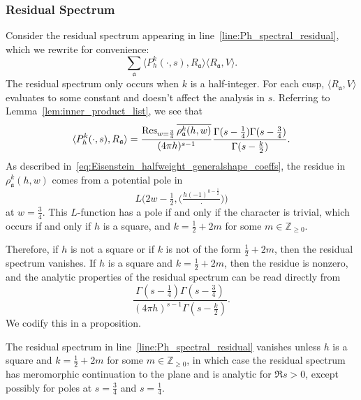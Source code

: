 \subsubsection*{Residual Spectrum}



Consider the residual spectrum appearing in line~\eqref{line:Ph_spectral_residual}, which
we rewrite for convenience:
\begin{equation}
  \sum_{\mathfrak{a}} \langle P_h^k(\cdot, s), R_{\mathfrak{a}} \rangle \langle
  R_{\mathfrak{a}}, V \rangle.
\end{equation}
The residual spectrum only occurs when $k$ is a half-integer.
For each cusp, $\langle R_{\mathfrak{a}}, V \rangle$ evaluates to some constant and
doesn't affect the analysis in $s$.
Referring to Lemma~\ref{lem:inner_product_list}, we see that
\begin{equation}
  \langle P_h^k(\cdot, s), R_{\mathfrak{a}} \rangle = \frac{\operatorname*{Res}_{w = \frac{3}{4}}
  \overline{\rho_\mathfrak{a}^k(h,w)}}{(4\pi h)^{s-1}} \frac{\Gamma(s - \frac{1}{4})
  \Gamma(s - \frac{3}{4})}{\Gamma(s - \frac{k}{2})}.
\end{equation}
As described in~\eqref{eq:Eisenstein_halfweight_generalshape_coeffs}, the residue in
$\rho_\mathfrak{a}^k(h,w)$ comes from a potential pole in
\begin{equation}
  L\Big(2w - \tfrac{1}{2}, \big( \tfrac{h (-1)^{k - \frac{1}{2}}}{\cdot}\big) \Big)
\end{equation}
at $w = \frac{3}{4}$.
This $L$-function has a pole if and only if the character is trivial, which occurs if and
only if $h$ is a square, and $k = \frac{1}{2} + 2m$ for some $m \in \mathbb{Z}_{\geq 0}$.


Therefore, if $h$ is not a square or if $k$ is not of the form $\frac{1}{2} + 2m$, then
the residual spectrum vanishes.
If $h$ is a square and $k = \frac{1}{2} + 2m$, then the residue is nonzero, and the
analytic properties of the residual spectrum can be read directly from
\begin{equation}\label{eq:hyperboloid:residual_analytic_descriptor}
  \frac{\Gamma(s - \frac{1}{4}) \Gamma(s - \frac{3}{4})}{(4\pi h)^{s-1} \Gamma(s -
  \frac{k}{2})}.
\end{equation}
We codify this in a proposition.


\begin{proposition}\label{prop:hyperboloid_residual_props}
  The residual spectrum in line~\eqref{line:Ph_spectral_residual} vanishes unless $h$ is a
  square and $k = \frac{1}{2} + 2m$ for some $m \in \mathbb{Z}_{\geq 0}$, in which case
  the residual spectrum has meromorphic continuation to the plane and is analytic for $\Re
  s > 0$, except possibly for poles at $s = \frac{3}{4}$ and $s = \frac{1}{4}$.
\end{proposition}




